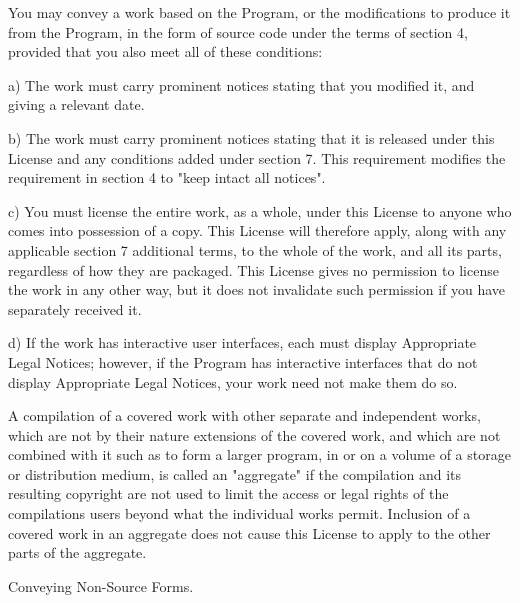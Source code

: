 You may convey a work based on the Program, or the modifications to produce it from the Program, in the form of source code under the terms of section 4, provided that you also meet all of these conditions\+: \begin{DoxyVerb}a) The work must carry prominent notices stating that you modified
it, and giving a relevant date.

b) The work must carry prominent notices stating that it is
released under this License and any conditions added under section
7.  This requirement modifies the requirement in section 4 to
"keep intact all notices".

c) You must license the entire work, as a whole, under this
License to anyone who comes into possession of a copy.  This
License will therefore apply, along with any applicable section 7
additional terms, to the whole of the work, and all its parts,
regardless of how they are packaged.  This License gives no
permission to license the work in any other way, but it does not
invalidate such permission if you have separately received it.

d) If the work has interactive user interfaces, each must display
Appropriate Legal Notices; however, if the Program has interactive
interfaces that do not display Appropriate Legal Notices, your
work need not make them do so.
\end{DoxyVerb}
 A compilation of a covered work with other separate and independent works, which are not by their nature extensions of the covered work, and which are not combined with it such as to form a larger program, in or on a volume of a storage or distribution medium, is called an "{}aggregate"{} if the compilation and its resulting copyright are not used to limit the access or legal rights of the compilation\textquotesingle{}s users beyond what the individual works permit. Inclusion of a covered work in an aggregate does not cause this License to apply to the other parts of the aggregate.


\begin{DoxyEnumerate}
\item Conveying Non-\/\+Source Forms.
\end{DoxyEnumerate}

